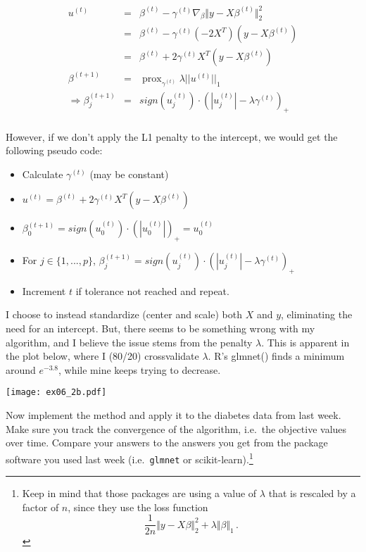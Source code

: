 \documentclass{article}
\newcommand{\prox}{ \mathop{\mathrm{prox}} }
\newcommand{\enorm}[1]{\Vert #1 \Vert_2}
\begin{document}
\begin{enumerate}[(A)]
\color{blue}
\begin{eqnarray*}
u^{(t)} &=& \beta^{(t)} - \gamma^{(t)} \nabla_\beta \enorm{y - X\beta^{(t)}}^2 \\
 &=& \beta^{(t)} - \gamma^{(t)}(-2X^T) (y - X\beta^{(t)})  \\
  &=& \beta^{(t)} + 2\gamma^{(t)}X^T(y - X\beta^{(t)})  \\
\beta^{(t+1)} &=& \prox_{\gamma^{(t)}} \lambda ||u^{(t)}||_1 \\
\Rightarrow \beta^{(t+1)}_j &=& sign(u_j^{(t)}) \cdot (|u^{(t)}_j| - \lambda\gamma^{(t)})_+ \\
\end{eqnarray*}

However, if we don't apply the L1 penalty to the intercept, we would get the following pseudo code:
\begin{itemize}
\item Calculate $\gamma^{(t)}$ (may be constant)
\item $u^{(t)} = \beta^{(t)} + 2\gamma^{(t)}X^T(y - X\beta^{(t)}) $
\item $\beta_0^{(t+1)} =  sign(u_0^{(t)}) \cdot (|u_0^{(t)}|)_+ = u_0^{(t)}$ 
\item For $j\in\{1,...,p\}$, $\beta_j^{(t+1)} = sign(u_j^{(t)}) \cdot (|u^{(t)}_j| - \lambda\gamma^{(t)})_+ $ 
\item Increment $t$ if tolerance not reached and repeat. 
\end{itemize}

I choose to instead standardize (center and scale) both $X$ and $y$, eliminating the need for an intercept. But, there seems to be something wrong with my algorithm, and I believe the issue stems from the penalty $\lambda$. This is apparent in the plot below, where I (80/20) crossvalidate $\lambda$. R's glmnet() finds a minimum around $e^{-3.8}$,  while mine keeps trying to decrease. 

\begin{center}
\texttt{[image: ex06\_2b.pdf]}
\end{center}

\color{black}

Now implement the method and apply it to the diabetes data from last week.  Make sure you track the convergence of the algorithm, i.e.~the objective values over time.  Compare your answers to the answers you get from the package software you used last week (i.e.~\verb|glmnet| or scikit-learn).\footnote{Keep in mind that those packages are using a value of $\lambda$ that is rescaled by a factor of $n$, since they use the loss function
$$
\frac{1}{2n} \enorm{y - X\beta}^2  + \lambda \Vert \beta \Vert_1 \, .
$$
}


\end{enumerate}
\end{document}
